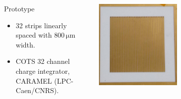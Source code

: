 \begin{frame}[t]
  \begin{columns}[]
    \begin{column}{0.45\textwidth}
      \begin{block}{Prototype}
        \begin{itemize}
          \item 32 strips linearly spaced with $800\,\mathrm{\mu m}$ width.
          \item COTS 32 channel charge integrator, CARAMEL (LPC-Caen/CNRS).
        \end{itemize}
      \end{block}
    \end{column}
    \begin{column}{0.45\textwidth}
      \centering
      \includegraphics[width=0.5\textwidth]{03_SIM/fig/fig000_strips2}
    \end{column}
  \end{columns}
\end{frame}

